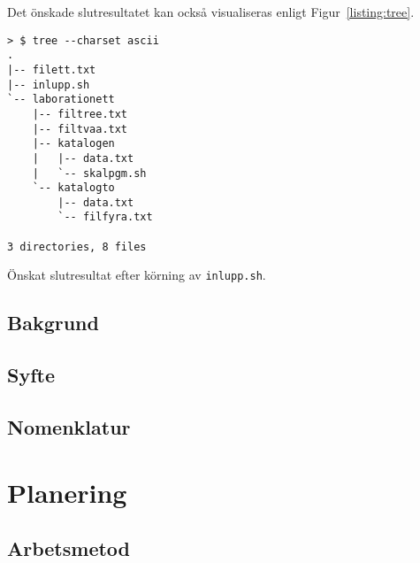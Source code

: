 Det önskade slutresultatet kan också visualiseras enligt Figur~\ref{listing:tree}.

\begin{listing}[H]
\begin{verbatim}
> $ tree --charset ascii
.
|-- filett.txt
|-- inlupp.sh
`-- laborationett
    |-- filtree.txt
    |-- filtvaa.txt
    |-- katalogen
    |   |-- data.txt
    |   `-- skalpgm.sh
    `-- katalogto
        |-- data.txt
        `-- filfyra.txt

3 directories, 8 files
\end{verbatim}
\caption{Önskat slutresultat efter körning av \texttt{inlupp.sh}.}
\label{listing:tree}
\end{listing}


\subsection{Bakgrund}


\subsection{Syfte}

\subsection{Nomenklatur}


\section{Planering}


\subsection{Arbetsmetod}

